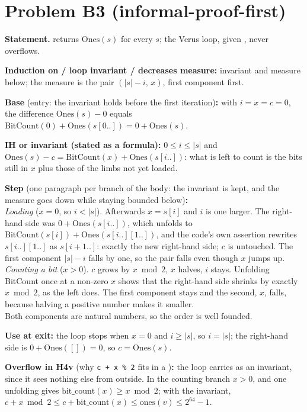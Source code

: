 \documentclass[11pt]{article}
\begin{document}
\section*{Problem B3 (informal-proof-first)}\label{ans:B3}
\begin{answer}
\textbf{Statement.}  returns $\mathrm{Ones}(s)$ for every $s$;
the Verus loop, given , never overflows.

\textbf{Induction on / loop invariant / decreases measure:} invariant and
measure below; the measure is the pair $(|s| - i,\, x)$, first component
first.

\textbf{Base} (entry: the invariant holds before the first iteration)\textbf{:}
with $i = x = c = 0$, the difference $\mathrm{Ones}(s) - 0$ equals
$\mathrm{BitCount}(0) + \mathrm{Ones}(s[0..]) = 0 + \mathrm{Ones}(s)$.

\textbf{IH or invariant (stated as a formula):}
$0 \leq i \leq |s|$ and $\mathrm{Ones}(s) - c = \mathrm{BitCount}(x) +
\mathrm{Ones}(s[i..])$: what is left to count is the bits still in $x$ plus
those of the limbs not yet loaded.

\textbf{Step} (one paragraph per branch of the body: the invariant is kept,
and the measure goes down while staying bounded below)\textbf{:} \\
\emph{Loading} ($x = 0$, so $i < |s|$). Afterwards $x = s[i]$ and $i$ is one
larger. The right-hand side was $0 + \mathrm{Ones}(s[i..])$, which unfolds to
$\mathrm{BitCount}(s[i]) + \mathrm{Ones}(s[i..][1..])$, and the code's own
assertion rewrites $s[i..][1..]$ as $s[i + 1..]$: exactly the new right-hand
side; $c$ is untouched. The first component $|s| - i$ falls by one, so the
pair falls even though $x$ jumps up. \\
\emph{Counting a bit} ($x > 0$). $c$ grows by $x \bmod 2$, $x$ halves, $i$
stays. Unfolding BitCount once at a non-zero $x$ shows that the right-hand
side shrinks by exactly $x \bmod 2$, as the left does. The first component
stays and the second, $x$, falls, because halving a positive number makes it
smaller. \\
Both components are natural numbers, so the order is well founded.

\textbf{Use at exit:} the loop stops when $x = 0$ and $i \geq |s|$, so
$i = |s|$; the right-hand side is $0 + \mathrm{Ones}([]) = 0$, so $c =
\mathrm{Ones}(s)$.

\textbf{Overflow in H4v} (why \texttt{c + x \% 2} fits in a )\textbf{:}
the loop carries  as an invariant, since it sees
nothing else from outside. In the counting branch $x > 0$, and one unfolding
gives $\mathrm{bit\_count}(x) \geq x \bmod 2$; with the invariant,
$c + x \bmod 2 \leq c + \mathrm{bit\_count}(x) \leq \mathrm{ones}(v) \leq
2^{64} - 1$.


\end{answer}
\end{document}
